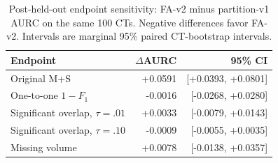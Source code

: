 \begin{table}[t]
\caption{Post-held-out endpoint sensitivity: FA-v2 minus partition-v1 AURC on the same 100 CTs. Negative differences favor FA-v2. Intervals are marginal 95\% paired CT-bootstrap intervals.}
\label{tab:sensitivity}
\centering\footnotesize
\begin{tabular}{lrr}
\hline
Endpoint & $\Delta$AURC & 95\% CI \\
\hline
Original M+S & +0.0591 & [+0.0393, +0.0801] \\
One-to-one $1-F_1$ & -0.0016 & [-0.0268, +0.0280] \\
Significant overlap, $\tau=.01$ & +0.0033 & [-0.0079, +0.0143] \\
Significant overlap, $\tau=.10$ & -0.0009 & [-0.0055, +0.0035] \\
Missing volume & +0.0078 & [-0.0138, +0.0357] \\
\hline
\end{tabular}
\end{table}
